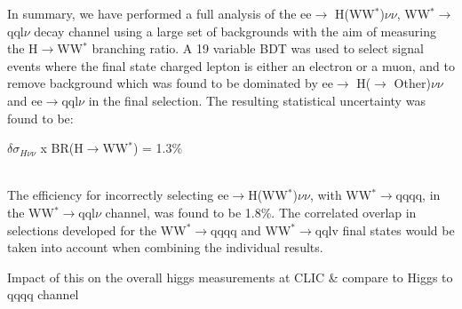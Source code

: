 In summary, we have performed a full analysis of the ee$\rightarrow$ H(WW$^*$)$\nu\nu$, WW$^*\rightarrow$qql$\nu$ decay channel using a large set of backgrounds with the aim of measuring the H$\rightarrow$WW$^*$ branching ratio. A 19 variable BDT was used to select signal events where the final state charged lepton is either an electron or a muon, and to remove background which was found to be dominated by ee$\rightarrow$ H($\rightarrow$ Other)$\nu\nu$  and ee$\rightarrow$qql$\nu$ in the final selection. The resulting statistical uncertainty was found to be: \\[10pt]\centerline{\large{$\delta\sigma_{H\nu\nu}$ x BR(H$\rightarrow$WW$^*$) = 1.3\%}} \\[10pt] The efficiency for incorrectly selecting ee$\rightarrow$H(WW$^*$)$\nu\nu$, with WW$^*\rightarrow$qqqq, in the WW$^*\rightarrow$qql$\nu$ channel, was found to be 1.8\%. The correlated overlap in selections developed for the WW$^*\rightarrow$qqqq and WW$^*\rightarrow$qqlv final states would be taken into account when combining the individual results.



Impact of this on the overall higgs measurements at CLIC \& compare to Higgs to qqqq channel
